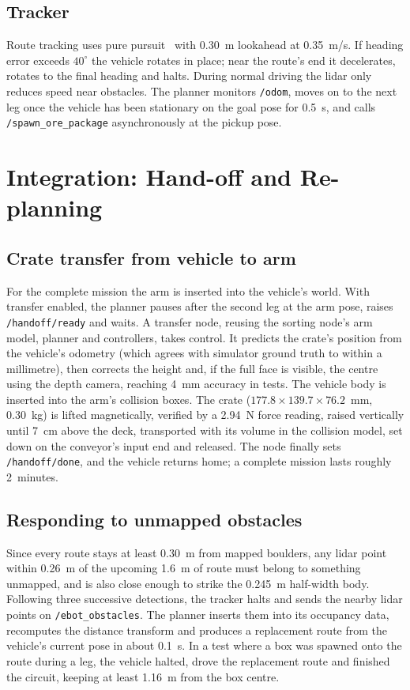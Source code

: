 \documentclass[conference]{IEEEtran}
\begin{document}
\subsection{Tracker}
Route tracking uses pure pursuit~\cite{coulter1992} with 0.30~m lookahead at 0.35~m/s. If heading error exceeds $40^\circ$ the vehicle rotates in place; near the route's end it decelerates, rotates to the final heading and halts. During normal driving the lidar only reduces speed near obstacles. The planner monitors \texttt{/odom}, moves on to the next leg once the vehicle has been stationary on the goal pose for 0.5~s, and calls \texttt{/spawn\_ore\_package} asynchronously at the pickup pose.

\section{Integration: Hand-off and Re-planning}
\subsection{Crate transfer from vehicle to arm}
For the complete mission the arm is inserted into the vehicle's world. With transfer enabled, the planner pauses after the second leg at the arm pose, raises \texttt{/handoff/ready} and waits. A transfer node, reusing the sorting node's arm model, planner and controllers, takes control. It predicts the crate's position from the vehicle's odometry (which agrees with simulator ground truth to within a millimetre), then corrects the height and, if the full face is visible, the centre using the depth camera, reaching 4~mm accuracy in tests. The vehicle body is inserted into the arm's collision boxes. The crate ($177.8\times139.7\times76.2$~mm, 0.30~kg) is lifted magnetically, verified by a 2.94~N force reading, raised vertically until 7~cm above the deck, transported with its volume in the collision model, set down on the conveyor's input end and released. The node finally sets \texttt{/handoff/done}, and the vehicle returns home; a complete mission lasts roughly 2~minutes.

\subsection{Responding to unmapped obstacles}
Since every route stays at least 0.30~m from mapped boulders, any lidar point within 0.26~m of the upcoming 1.6~m of route must belong to something unmapped, and is also close enough to strike the 0.245~m half-width body. Following three successive detections, the tracker halts and sends the nearby lidar points on \texttt{/ebot\_obstacles}. The planner inserts them into its occupancy data, recomputes the distance transform and produces a replacement route from the vehicle's current pose in about 0.1~s. In a test where a box was spawned onto the route during a leg, the vehicle halted, drove the replacement route and finished the circuit, keeping at least 1.16~m from the box centre.
\end{document}
